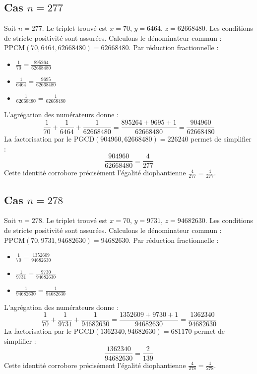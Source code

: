 \documentclass[11pt,a4paper]{article}
\begin{document}
\subsection{Cas $n = 277$}
Soit $n = 277$. Le triplet trouvé est $x = 70$, $y = 6464$, $z = 62668480$.
Les conditions de stricte positivité sont assurées.
Calculons le dénominateur commun : $\text{PPCM}(70, 6464, 62668480) = 62668480$.
Par réduction fractionnelle :
\begin{itemize}
    \item $\frac{1}{70} = \frac{895264}{62668480}$
    \item $\frac{1}{6464} = \frac{9695}{62668480}$
    \item $\frac{1}{62668480} = \frac{1}{62668480}$
\end{itemize}
L'agrégation des numérateurs donne :
$$ \frac{1}{70} + \frac{1}{6464} + \frac{1}{62668480} = \frac{895264 + 9695 + 1}{62668480} = \frac{904960}{62668480} $$
La factorisation par le $\text{PGCD}(904960, 62668480) = 226240$ permet de simplifier :
$$ \frac{904960}{62668480} = \frac{4}{277} $$
Cette identité corrobore précisément l'égalité diophantienne $\frac{4}{277} = \frac{4}{277}$.

\subsection{Cas $n = 278$}
Soit $n = 278$. Le triplet trouvé est $x = 70$, $y = 9731$, $z = 94682630$.
Les conditions de stricte positivité sont assurées.
Calculons le dénominateur commun : $\text{PPCM}(70, 9731, 94682630) = 94682630$.
Par réduction fractionnelle :
\begin{itemize}
    \item $\frac{1}{70} = \frac{1352609}{94682630}$
    \item $\frac{1}{9731} = \frac{9730}{94682630}$
    \item $\frac{1}{94682630} = \frac{1}{94682630}$
\end{itemize}
L'agrégation des numérateurs donne :
$$ \frac{1}{70} + \frac{1}{9731} + \frac{1}{94682630} = \frac{1352609 + 9730 + 1}{94682630} = \frac{1362340}{94682630} $$
La factorisation par le $\text{PGCD}(1362340, 94682630) = 681170$ permet de simplifier :
$$ \frac{1362340}{94682630} = \frac{2}{139} $$
Cette identité corrobore précisément l'égalité diophantienne $\frac{4}{278} = \frac{4}{278}$.
\end{document}

